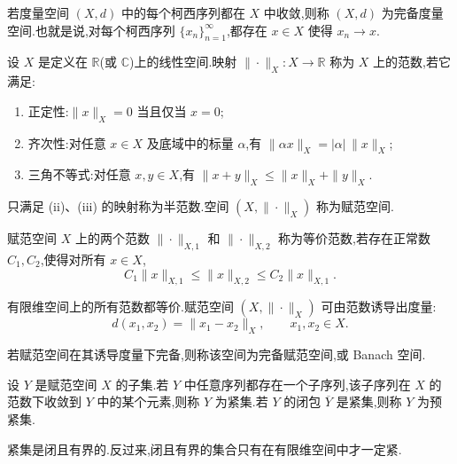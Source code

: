 \begin{definition}[完备度量空间]\label{def:appendix-a-5}
若度量空间 $(X,d)$ 中的每个柯西序列都在 $X$ 中收敛,则称 $(X,d)$ 为完备度量空间.也就是说,对每个柯西序列 $\{x_n\}_{n=1}^{\infty}$,都存在 $x\in X$ 使得 $x_n\to x$.
\end{definition}

\begin{definition}\label{def:appendix-a-6}
设 $X$ 是定义在 $\mathbb R$(或 $\mathbb C$)上的线性空间.映射 $\|\cdot\|_X:X\to\mathbb R$ 称为 $X$ 上的范数,若它满足:
\begin{enumerate}[label=(\roman*)]
  \item 正定性:$\|x\|_X=0$ 当且仅当 $x=0$;
  \item 齐次性:对任意 $x\in X$ 及底域中的标量 $\alpha$,有 $\|\alpha x\|_X=|\alpha|\,\|x\|_X$;
  \item 三角不等式:对任意 $x,y\in X$,有 $\|x+y\|_X\le\|x\|_X+\|y\|_X$.
\end{enumerate}
只满足 (ii)、(iii) 的映射称为半范数.空间 $(X,\|\cdot\|_X)$ 称为赋范空间.
\end{definition}

\begin{definition}[等价范数]\label{def:appendix-a-7}
赋范空间 $X$ 上的两个范数 $\|\cdot\|_{X,1}$ 和 $\|\cdot\|_{X,2}$ 称为等价范数,若存在正常数 $C_1,C_2$,使得对所有 $x\in X$,
\[
 C_1\|x\|_{X,1}\le\|x\|_{X,2}\le C_2\|x\|_{X,1}.
\]
\end{definition}

\begin{note}[关于范数]\label{note:appendix-a-8}
有限维空间上的所有范数都等价.赋范空间 $(X,\|\cdot\|_X)$ 可由范数诱导出度量:
\[
 d(x_1,x_2)=\|x_1-x_2\|_X,\qquad x_1,x_2\in X.
\]
\end{note}

\begin{definition}[Banach 空间]\label{def:appendix-a-9}
若赋范空间在其诱导度量下完备,则称该空间为完备赋范空间,或 Banach 空间.
\end{definition}

\begin{note}[紧集与预紧集]\label{note:appendix-a-10}
设 $Y$ 是赋范空间 $X$ 的子集.若 $Y$ 中任意序列都存在一个子序列,该子序列在 $X$ 的范数下收敛到 $Y$ 中的某个元素,则称 $Y$ 为紧集.若 $Y$ 的闭包 $\overline Y$ 是紧集,则称 $Y$ 为预紧集.

紧集是闭且有界的.反过来,闭且有界的集合只有在有限维空间中才一定紧.
\end{note}

